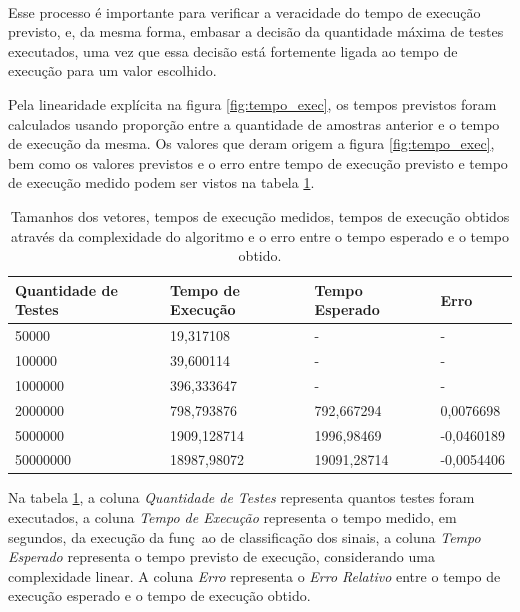 \documentclass[a4paper,12pt,oneside]{report}
\begin{document}
\\
\par Esse processo \'{e} importante para verificar a veracidade do tempo de execu\c{c}\~{a}o previsto, e, da mesma forma, embasar a decis\~{a}o da quantidade m\'{a}xima de testes executados, uma vez que essa decis\~{a}o est\'{a} fortemente ligada ao tempo de execu\c{c}\~{a}o para um valor escolhido. 
\\
\par Pela linearidade expl\'{i}cita na figura \ref{fig:tempo_exec}, os tempos previstos foram calculados usando propor\c{c}\~{a}o entre a quantidade de amostras anterior e o tempo de execu\c{c}\~{a}o da mesma. Os valores que deram origem a figura \ref{fig:tempo_exec}, bem como os valores previstos e o erro entre tempo de execu\c{c}\~{a}o previsto e tempo de execu\c{c}\~{a}o medido podem ser vistos na tabela \ref{tab:tabela_erro}. 
\begin{center}
\begin{table}[H]
    \begin{tabular}{ | l | l | l | p{1.8cm} |}
    \hline
    Quantidade de Testes & Tempo de Execu\c{c}\~{a}o & Tempo Esperado & Erro \\ \hline
    50000 & 19,317108 & - & - \\ \hline
    100000 & 39,600114 & - & - \\ \hline
    1000000 & 396,333647 & - & - \\\hline
    2000000 & 798,793876 & 792,667294 & 0,0076698 \\ \hline
    5000000 & 1909,128714 & 1996,98469 & -0,0460189 \\ \hline
    50000000 & 18987,98072 & 19091,28714 & -0,0054406\\ \hline
    \end{tabular}
\caption{Tamanhos dos vetores, tempos de execu\c{c}\~{a}o medidos, tempos de execu\c{c}\~{a}o obtidos atrav\'{e}s da complexidade do algoritmo e o erro entre o tempo esperado e o tempo obtido.}
\label{tab:tabela_erro}
\end{table}
\end{center}
\par Na tabela \ref{tab:tabela_erro}, a coluna \emph{Quantidade de Testes} representa quantos testes foram executados, a coluna \emph{Tempo de Execu\c{c}\~{a}o} representa o tempo medido, em segundos, da execu\c{c}\~{a}o da fun\c{c}~{a}o de classifica\c{c}\~{a}o dos sinais, a coluna \emph{Tempo Esperado} representa o tempo previsto de exe\-cu\-\c{c}\~{a}o, considerando uma complexidade linear. A coluna \emph{Erro} representa o \emph{Erro Relativo}\cite{calc_numerico} entre o tempo de execu\c{c}\~{a}o esperado e o tempo de execu\c{c}\~{a}o obtido. 
\end{document}
